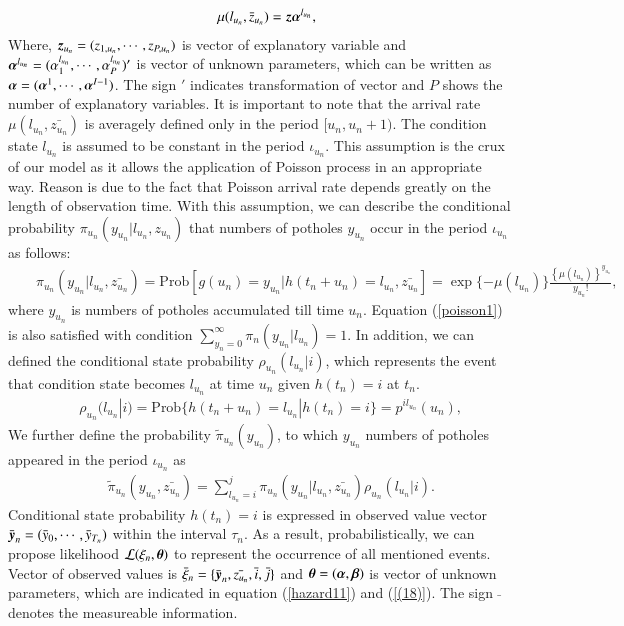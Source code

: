 \documentclass[a4paper,oneside,onecolumn,preprint,10pt,authoryear]{elsarticle}
\begin{document}
\begin{eqnarray}
&& \mu(l_{u_n},\bar{z}_{u_n})= \mbox{\boldmath$z$}\mbox{\boldmath$\alpha$}^{l_{u_n}}, \label{(18)}
\end{eqnarray}
Where, $\mbox{\boldmath$z$}_{u_n}=(z_{1,u_n},\cdots,z_{P,u_n})$ is vector of explanatory variable and  $\mbox{\boldmath$\alpha$}^{l_{u_n}}=(\alpha_1^{l_{u_n}},\cdots,\alpha_{P}^{l_{u_n}})^\prime$ is vector of unknown parameters, which can be written as  $\mbox{\boldmath$\alpha$}=(\mbox{\boldmath$\alpha$}^1,\cdots,\mbox{\boldmath$\alpha$}^{I-1})$. The sign $\prime$ indicates transformation of vector and $P$ shows the number of explanatory variables. It is important to note that the arrival rate $\mu(l_{u_n},\bar{z_{u_n}})$ is averagely defined only in the period $[u_n, u_n+1)$. The condition state $l_{u_n}$ is assumed to be constant in the period $\iota_{u_n}$. This assumption is the crux of our model as it allows  the application of Poisson process in an appropriate way. Reason is due to the fact that Poisson arrival rate depends greatly on the length of observation time. With this assumption, we can describe the conditional probability $\pi_{u_n}(y_{u_n}|l_{u_n},z_{u_n})$ that numbers of potholes $y_{u_n}$ occur in the period $\iota_{u_n}$ as follows:
\begin{eqnarray}
&& \pi_{u_n}(y_{u_n}|l_{u_n},\bar{z_{u_n}}) =\mbox{Prob}[g(u_n)=y_{u_n}|h(t_n+u_n)=l_{u_n},\bar{z_{u_n}}]=\exp\{-\mu(l_{u_n})\}\frac{\left\{\mu(l_{u_n})\right\}^{y_{u_n}}}{y_{u_n}!},\label{poisson1}
\end{eqnarray}
where $y_{u_n}$ is numbers of potholes accumulated till time $u_n$. Equation (\ref{poisson1}) is also satisfied with condition $\sum_{y_n=0}^\infty \pi_n(y_{u_n}|l_{u_n})=1$. In addition, we can defined the conditional state probability $\rho_{u_n}(l_{u_n}|i)$, which represents the event that condition state becomes $l_{u_n}$ at time $u_n$ given $h(t_n) = i$ at $t_n$. 
\begin{eqnarray}
&& \rho_{u_n}(l_{u_n}|i)=\mbox{Prob}\{h(t_n+u_n)=l_{u_n}|h(t_n)=i\}= p^{il_{u_n}}(u_n),
\end{eqnarray}
We further define the probability $\tilde{\pi}_{u_n}(y_{u_n})$, to which $y_{u_n} $ numbers of potholes appeared in the period $\iota_{u_n}$ as
\begin{eqnarray}
&& \tilde{\pi}_{u_n}(y_{u_n},\bar{z_{u_n}}) = \sum_{l_{u_n}=i}^j \pi_{u_n}(y_{u_n}|l_{u_n},\bar{z_{u_n}}) \rho_{u_n}(l_{u_n}|i).  
\end{eqnarray}
Conditional state probability $h(t_n)=i$ is expressed in observed value vector $\bar{\mbox{\boldmath$y$}}_n=(\bar{y}_0,\cdots,\bar{y}_{T_n})$ within the interval $\tau_n$. As a result, probabilistically, we can propose likelihood ${\cal L}(\xi_n,\mbox{\boldmath$\theta$})$ to represent the occurrence of all mentioned events. Vector of observed values is  $\bar{\xi}_n=\{\bar{\mbox{\boldmath$y$}}_n,\bar{z_{u_n}},\bar{i},\bar{j}\}$ and $\mbox{\boldmath$\theta$}=(\mbox{\boldmath$\alpha$},\mbox{\boldmath$\beta$})$ is vector of unknown parameters, which are indicated in equation (\ref{hazard11}) and (\ref{(18)}). The sign $\bar{ }$ denotes the measureable information.
\end{document}
